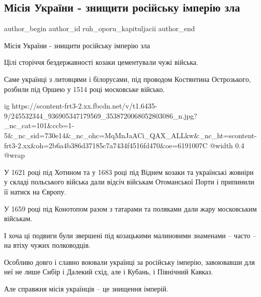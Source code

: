  
 
 
 
 
 
\subsection{Місія України - знищити російську імперію зла}
\label{sec:14_10_2021.fb.ruh_oporu_kapituljacii.1.meta_ukrainy_rusimperia}
 
\ifcmt
 author_begin
   author_id ruh_oporu_kapituljacii
 author_end
\fi

Місія України - знищити російську імперію зла

Цілі сторіччя бездержавності  козаки цементували чужі війська.

Саме українці з литовцями і білорусами, під проводом Костянтина Острозького,
розбили під Оршею у 1514 році московське військо.

\ifcmt
  ig https://scontent-frt3-2.xx.fbcdn.net/v/t1.6435-9/245532344_936905347179569_3538720068052803086_n.jpg?_nc_cat=101&ccb=1-5&_nc_sid=730e14&_nc_ohc=MqMnJaACi_QAX_ALLkw&_nc_ht=scontent-frt3-2.xx&oh=2b6a4b386d37185c7a7434f4516fd470&oe=6191007C
  @width 0.4
  @wrap 
\fi

У 1621 році під Хотином та у 1683 році під Віднем козаки та українські жовніри
у складі польського війська дали відсіч військам Отоманської Порти і припинили
її натиск на Європу.

У 1659 році під Конотопом разом з татарами та поляками дали жару московським
військам.

І хоча ці подвиги були звершені під козацькими малиновими знаменами – часто –
на втіху чужих полководців.

Особливо довго і славно воювали українці за російську імперію, завоювавши для
неї не лише Сибір і Далекий схід, але і Кубань, і Північний Кавказ.

Але справжня місія українців – це знищення імперій.

